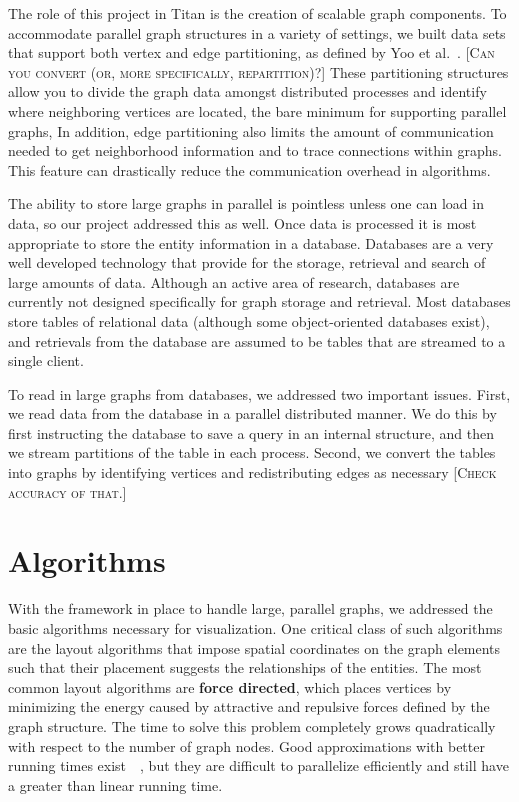 \documentclass[pdf,12pt,report,strict]{SANDreport}
\newcommand*{\lcite}[1]{~\cite{#1}}
\newcommand*{\scite}[1]{~\cite{#1}}
\newcommand{\titan}{Titan\xspace}
\newcommand*{\keyterm}[1]{\textbf{#1}}
\newcommand{\sticky}[1]{\textsc{[#1]}}
\begin{document}

The role of this project in \titan is the creation of scalable graph
components.  To accommodate parallel graph structures in a variety of
settings, we built data sets that support both vertex and edge
partitioning, as defined by Yoo et al.\scite{Yoo05}. \sticky{Can
  you convert (or, more specifically, repartition)?}  These partitioning
structures allow you to divide the graph data amongst distributed processes
and identify where neighboring vertices are located, the bare minimum for
supporting parallel graphs, In addition, edge partitioning also limits the
amount of communication needed to get neighborhood information and to trace
connections within graphs.  This feature can drastically reduce the
communication overhead in algorithms.

The ability to store large graphs in parallel is pointless unless one can
load in data, so our project addressed this as well.  Once data is
processed it is most appropriate to store the entity information in a
database.  Databases are a very well developed technology that provide for
the storage, retrieval and search of large amounts of data.  Although an
active area of research, databases are currently not designed specifically
for graph storage and retrieval.  Most databases store tables of relational
data (although some object-oriented databases exist), and retrievals from
the database are assumed to be tables that are streamed to a single client.

To read in large graphs from databases, we addressed two important issues.
First, we read data from the database in a parallel distributed manner.  We
do this by first instructing the database to save a query in an internal
structure, and then we stream partitions of the table in each process.
Second, we convert the tables into graphs by identifying vertices and
redistributing edges as necessary \sticky{Check accuracy of that.}

\section{Algorithms}


With the framework in place to handle large, parallel graphs, we addressed
the basic algorithms necessary for visualization.  One critical class of
such algorithms are the layout algorithms that impose spatial coordinates
on the graph elements such that their placement suggests the relationships
of the entities.  The most common layout algorithms are
\keyterm{force directed}, which places
vertices by minimizing the energy caused by attractive and repulsive
forces defined by the graph structure.  The time to solve this problem
completely grows quadratically with respect to the number of graph nodes.
Good approximations with better running times exist~\lcite{Hachul04}, but
they are difficult to parallelize efficiently and still have a greater than
linear running time.
\end{document}
